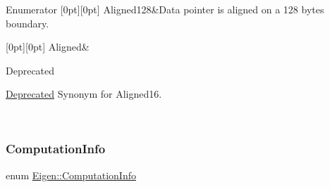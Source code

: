\begin{DoxyEnumFields}{Enumerator}
[0pt][0pt]{}\mbox{\label{group__enums_gga45fe06e29902b7a2773de05ba27b47a1a60057da2408e499b5656244d0b26cc20}} 
Aligned128&Data pointer is aligned on a 128 bytes boundary. \\
\hline

[0pt][0pt]{}\mbox{\label{group__enums_gga45fe06e29902b7a2773de05ba27b47a1ae12d0f8f869c40c76128260af2242bc8}} 
Aligned&\begin{DoxyRefDesc}{Deprecated}
\item[\mbox{\hyperlink{deprecated__deprecated000014}{Deprecated}}]Synonym for Aligned16. \end{DoxyRefDesc}
\\
\hline

\end{DoxyEnumFields}
\mbox{\label{group__enums_ga85fad7b87587764e5cf6b513a9e0ee5e}} 
\subsubsection{\texorpdfstring{ComputationInfo}{ComputationInfo}}
{\footnotesize\ttfamily enum \mbox{\hyperlink{group__enums_ga85fad7b87587764e5cf6b513a9e0ee5e}{Eigen\+::\+Computation\+Info}}}

